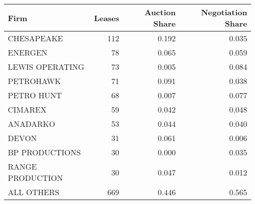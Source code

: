 
\begin{tabular}{lrrr}
\toprule
Firm & Leases & Auction Share & Negotiation Share\\
\midrule
CHESAPEAKE & 112 & 0.192 & 0.035\\
ENERGEN & 78 & 0.065 & 0.059\\
LEWIS OPERATING & 73 & 0.005 & 0.084\\
PETROHAWK & 71 & 0.091 & 0.038\\
PETRO HUNT & 68 & 0.007 & 0.077\\
CIMAREX & 59 & 0.042 & 0.048\\
ANADARKO & 53 & 0.044 & 0.040\\
DEVON & 31 & 0.061 & 0.006\\
BP PRODUCTIONS & 30 & 0.000 & 0.035\\
RANGE PRODUCTION & 30 & 0.047 & 0.012\\
\midrule
ALL OTHERS & 669 & 0.446 & 0.565\\
\bottomrule
\end{tabular}
